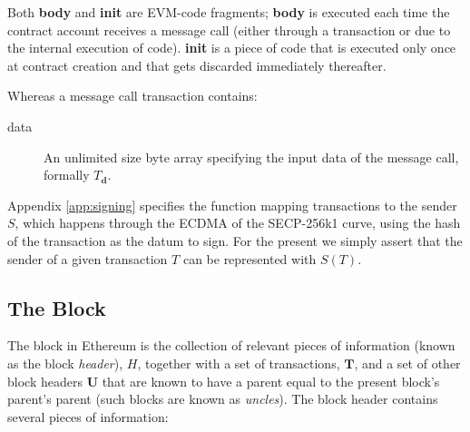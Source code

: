 \documentclass[9pt,oneside]{amsart}
\begin{document}
\begin{multicols}{2}
Both \textbf{body} and \textbf{init} are EVM-code fragments; \textbf{body} is executed each time the contract account receives a message call (either through a transaction or due to the internal execution of code). \textbf{init} is a piece of code that is executed only once at contract creation and that gets discarded immediately thereafter.

Whereas a message call transaction contains:

\begin{description}
\item[data] An unlimited size byte array specifying the input data of the message call, formally $T_\mathbf{d}$.
\end{description}

Appendix \ref{app:signing} specifies the function mapping transactions to the sender $S$, which happens through the ECDMA of the SECP-256k1 curve, using the hash of the transaction as the datum to sign. For the present we simply assert that the sender of a given transaction $T$ can be represented with $S(T)$.

\subsection{The Block} \label{ch:block}

The block in Ethereum is the collection of relevant pieces of information (known as the block \textit{header}), $H$, together with a set of transactions, $\mathbf{T}$, and a set of other block headers $\mathbf{U}$ that are known to have a parent equal to the present block's parent's parent (such blocks are known as \textit{uncles}). The block header contains several pieces of information:


\end{multicols}
\end{document}
